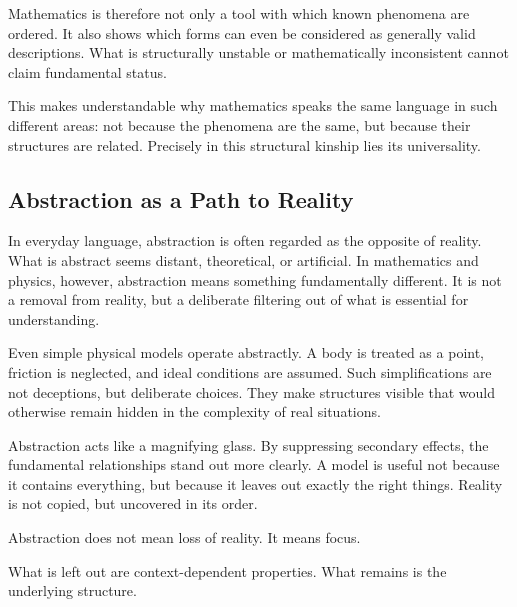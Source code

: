 Mathematics is therefore not only a tool
with which known phenomena are ordered.
It also shows
which forms can even be considered
as generally valid descriptions.
What is structurally unstable or mathematically inconsistent
cannot claim fundamental status.

This makes understandable
why mathematics speaks the same language
in such different areas:
not because the phenomena are the same,
but because their structures are related.
Precisely in this structural kinship
lies its universality.


\subsection{Abstraction as a Path to Reality}

In everyday language,
abstraction
is often regarded as the opposite of reality.
What is abstract
seems distant,
theoretical,
or artificial.
In mathematics
and physics,
however, abstraction means something fundamentally different.
It is not a removal from reality,
but a deliberate filtering out of what is essential
for understanding.

Even simple physical models
operate abstractly.
A body is treated as a point,
friction is neglected,
and ideal conditions are assumed.
Such simplifications are not deceptions,
but deliberate choices.
They make structures visible
that would otherwise remain hidden
in the complexity of real situations.

Abstraction acts like a magnifying glass.
By suppressing secondary effects,
the fundamental relationships
stand out more clearly.
A model is useful not because
it contains everything,
but because it leaves out exactly the right things.
Reality is not copied,
but uncovered in its order.

\begin{DidacticBox}
	\label{box:abstraction}
	Abstraction does not mean loss of reality.
	It means focus.
	
	What is left out
	are context-dependent properties.
	What remains
	is the underlying structure.
\end{DidacticBox}

